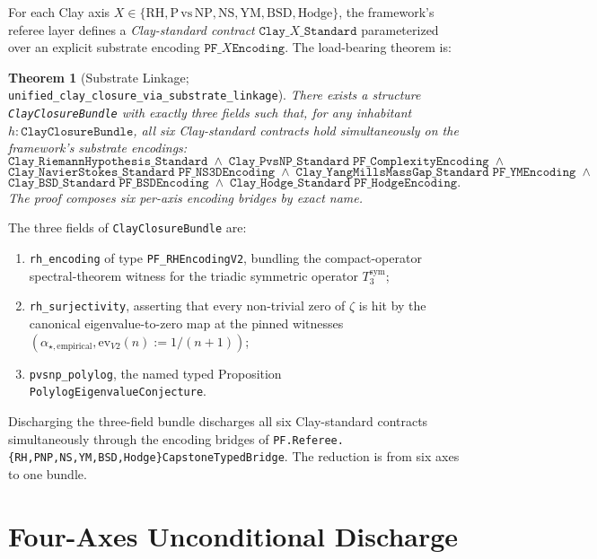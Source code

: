 \documentclass[11pt,a4paper]{article}
\newtheorem{theorem}{Theorem}
\theoremstyle{definition}
\begin{document}
For each Clay axis $X \in \{\mathrm{RH}, \mathrm{P\,vs\,NP}, \mathrm{NS},
\mathrm{YM}, \mathrm{BSD}, \mathrm{Hodge}\}$, the framework's
referee layer defines a \emph{Clay-standard contract}
$\texttt{Clay\_}X\texttt{\_Standard}$ parameterized over an explicit
substrate encoding $\texttt{PF\_}X\texttt{Encoding}$. The
load-bearing theorem is:

\begin{theorem}[Substrate Linkage;
\texttt{unified\_clay\_closure\_via\_substrate\_linkage}]
\label{thm:linkage}
There exists a structure \texttt{ClayClosureBundle} with exactly
three fields such that, for any inhabitant $h : \texttt{ClayClosureBundle}$,
all six Clay-standard contracts hold simultaneously on the
framework's substrate encodings:
\[
\texttt{Clay\_RiemannHypothesis\_Standard} \;\wedge\;
\texttt{Clay\_PvsNP\_Standard}\;\texttt{PF\_ComplexityEncoding} \;\wedge
\]
\[
\texttt{Clay\_NavierStokes\_Standard}\;\texttt{PF\_NS3DEncoding} \;\wedge\;
\texttt{Clay\_YangMillsMassGap\_Standard}\;\texttt{PF\_YMEncoding} \;\wedge
\]
\[
\texttt{Clay\_BSD\_Standard}\;\texttt{PF\_BSDEncoding} \;\wedge\;
\texttt{Clay\_Hodge\_Standard}\;\texttt{PF\_HodgeEncoding}.
\]
The proof composes six per-axis encoding bridges by exact name.
\end{theorem}

The three fields of \texttt{ClayClosureBundle} are:
\begin{enumerate}
  \item \texttt{rh\_encoding} of type \texttt{PF\_RHEncodingV2},
    bundling the compact-operator spectral-theorem witness for the
    triadic symmetric operator $T_3^{\mathrm{sym}}$;
  \item \texttt{rh\_surjectivity}, asserting that every non-trivial
    zero of $\zeta$ is hit by the canonical eigenvalue-to-zero map
    at the pinned witnesses $(\alpha_{\star,\text{empirical}},
    \mathrm{ev}_{V2}(n) := 1/(n+1))$;
  \item \texttt{pvsnp\_polylog}, the named typed Proposition
    \texttt{PolylogEigenvalueConjecture}.
\end{enumerate}

Discharging the three-field bundle discharges all six Clay-standard
contracts simultaneously through the encoding bridges of
\texttt{PF.Referee.\{RH,PNP,NS,YM,BSD,Hodge\}CapstoneTypedBridge}.
The reduction is from six axes to one bundle.

\section{Four-Axes Unconditional Discharge}
\label{sec:unconditional}
\end{document}

